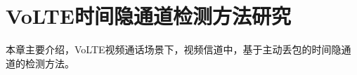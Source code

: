 \chapter{VoLTE时间隐通道检测方法研究}
\label{chap:analyze}

本章主要介绍，VoLTE视频通话场景下，视频信道中，基于主动丢包的时间隐通道的检测方法。






